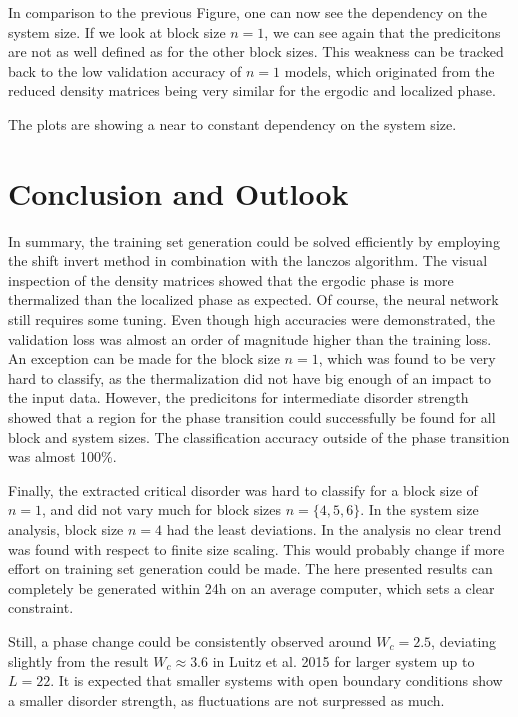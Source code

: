 \documentclass[reprint,amsmath,amssymb,aps,prb]{revtex4-2}
\begin{document}
In comparison to the previous Figure, one can now see the dependency on the system size.
If we look at block size $n=1$, we can see again that the predicitons are not as well defined as for the other block sizes. This weakness can be tracked back to the low validation accuracy of $n=1$ models, which originated from the reduced density matrices being very similar for the ergodic and localized phase.

The plots are showing a near to constant dependency on the system size.

\section{Conclusion and Outlook}

In summary, the training set generation could be solved efficiently by employing the shift invert method in combination with the lanczos algorithm. The visual inspection of the density matrices showed that the ergodic phase is more thermalized than the localized phase as expected. Of course, the neural network still requires some tuning. Even though high accuracies were demonstrated, the validation loss was almost an order of magnitude higher than the training loss. An exception can be made for the block size $n=1$, which was found to be very hard to classify, as the thermalization did not have big enough of an impact to the input data.
However, the predicitons for intermediate disorder strength showed that a region for the phase transition could successfully be found for all block and system sizes. The classification accuracy outside of the phase transition was almost 100\%. 

Finally, the extracted critical disorder was hard to classify for a block size of $n=1$, and did not vary much for block sizes $n=\{4,5,6\}$. In the system size analysis, block size $n=4$ had the least deviations. In the analysis no clear trend was found with respect to finite size scaling. This would probably change if more effort on training set generation could be made. The here presented results can completely be generated within 24h on an average computer, which sets a clear constraint.

Still, a phase change could be consistently observed around $W_c=2.5$, deviating slightly from the result $W_c\approx3.6$ in Luitz et al. 2015 for larger system up to $L=22$.\cite{Luitz2015} It is expected that smaller systems with open boundary conditions show a smaller disorder strength, as fluctuations are not surpressed as much.
\end{document}
